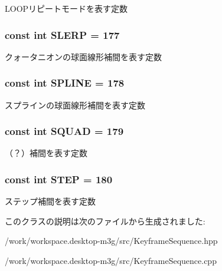 LOOPリピートモードを表す定数 \hypertarget{classm3g_1_1KeyframeSequence_77ebb943765f530d2883e1c26127d3ce}{
\subsubsection[{SLERP}]{\setlength{\rightskip}{0pt plus 5cm}const int {\bf SLERP} = 177}}
\label{classm3g_1_1KeyframeSequence_77ebb943765f530d2883e1c26127d3ce}


クォータニオンの球面線形補間を表す定数 \hypertarget{classm3g_1_1KeyframeSequence_fbb002ac924c1349dead17c16b6fa720}{
\subsubsection[{SPLINE}]{\setlength{\rightskip}{0pt plus 5cm}const int {\bf SPLINE} = 178}}
\label{classm3g_1_1KeyframeSequence_fbb002ac924c1349dead17c16b6fa720}


スプラインの球面線形補間を表す定数 \hypertarget{classm3g_1_1KeyframeSequence_0ad85e76e101b5eabf5a5c5f48648845}{
\subsubsection[{SQUAD}]{\setlength{\rightskip}{0pt plus 5cm}const int {\bf SQUAD} = 179}}
\label{classm3g_1_1KeyframeSequence_0ad85e76e101b5eabf5a5c5f48648845}


（？）補間を表す定数 \hypertarget{classm3g_1_1KeyframeSequence_07dc1c0bf7f480095150d1b1c34c8218}{
\subsubsection[{STEP}]{\setlength{\rightskip}{0pt plus 5cm}const int {\bf STEP} = 180}}
\label{classm3g_1_1KeyframeSequence_07dc1c0bf7f480095150d1b1c34c8218}


ステップ補間を表す定数 

このクラスの説明は次のファイルから生成されました:\begin{CompactItemize}
\item 
/work/workspace.desktop-m3g/src/KeyframeSequence.hpp\item 
/work/workspace.desktop-m3g/src/KeyframeSequence.cpp\end{CompactItemize}
